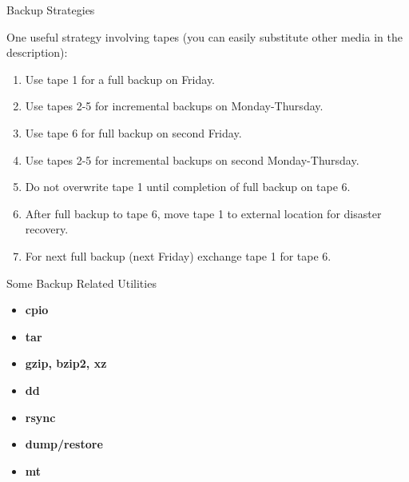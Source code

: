 \begin{frame}
   {Backup Strategies}

   One useful strategy involving tapes (you can easily
   substitute other media in the description):

   \begin{enumerate}
      \item Use tape 1 for a full backup on Friday.
      \item Use tapes 2-5 for incremental backups on
      Monday-Thursday.
      \item Use tape 6 for full backup on second Friday.
      \item Use tapes 2-5 for incremental backups on second
      Monday-Thursday.
      \item Do not overwrite tape 1 until completion of full
      backup on tape 6.
      \item After full backup to tape 6, move tape 1 to
      external location for disaster recovery.
      \item For next full backup (next Friday) exchange tape 1
      for tape 6.
   \end{enumerate}

\end{frame}

\cprotect{}


\begin{frame}
   {Some Backup Related Utilities}

   \begin{itemize}
      \item \textbf{cpio}
      \item \textbf{tar}
      \item \textbf{gzip, bzip2, xz}
      \item \textbf{dd}
      \item \textbf{rsync}
      \item \textbf{dump/restore}
      \item \textbf{mt}

   \end{itemize}

\end{frame}


